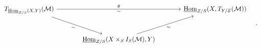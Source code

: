\[\begin{tikzcd}[column sep=large,row sep=large]
T_{\underline{\operatorname{Hom}}_{Z/S}(X,Y)}(\mathcal M) \arrow[rr,"\theta","\sim"'] \arrow[dr,"\sim"'] && \underline{\operatorname{Hom}}_{Z/S}(X,T_{Y/Z}(\mathcal M))\\
& \underline{\operatorname{Hom}}_{Z/S}(X\times_S I_S(\mathcal M),Y) \arrow[ur,"\sim"']
\end{tikzcd}\quad .\]
